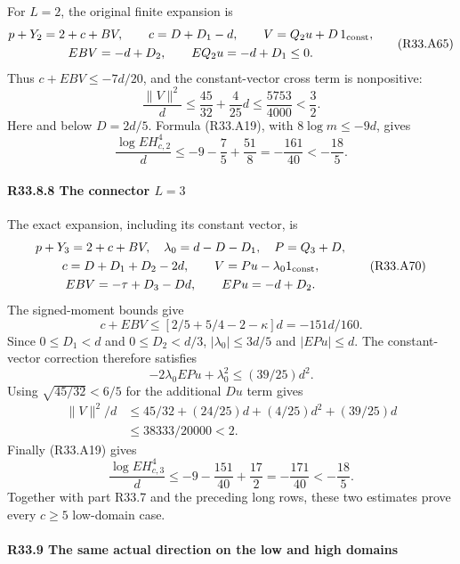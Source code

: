 For \(L=2\), the original finite expansion is
\[
\begin{gathered}
 p+Y_2=2+c+BV,\qquad
 c=D+D_1-d,\qquad V=Q_2u+D\,1_{\rm const},\\
 EBV=-d+D_2,\qquad EQ_2u=-d+D_1\le0 .
\end{gathered}                                                     \tag{R33.A65}
\]
Thus \(c+EBV\le-7d/20\), and the constant-vector cross term is
nonpositive:
\[
 \frac{\|V\|^2}{d}\le\frac{45}{32}+\frac4{25}d
 \le\frac{5753}{4000}<\frac32.
\]
Here and below \(D=2d/5\). Formula (R33.A19), with
\(8\log m\le-9d\), gives
\[
 \frac{\log EH_{c,2}^4}{d}
 \le-9-\frac75+\frac{51}{8}
 =-\frac{161}{40}<-\frac{18}{5}.                    \tag{R33.A66}
\]

\paragraph{R33.8.8 The connector \(L=3\)}
The exact expansion, including its constant vector, is
\[
\begin{gathered}
 p+Y_3=2+c+BV,\quad
 \lambda_0=d-D-D_1,\quad P=Q_3+D,\\
 c=D+D_1+D_2-2d,\qquad V=Pu-\lambda_0 1_{\rm const},\\
 EBV=-\tau+D_3-Dd,\qquad EPu=-d+D_2 .
\end{gathered}                                                     \tag{R33.A70}
\]
The signed-moment bounds give
\[
 c+EBV\le[2/5+5/4-2-\kappa]d
 =-151d/160.                                         \tag{R33.A71}
\]
Since \(0\le D_1<d\) and \(0\le D_2<d/3\),
\( |\lambda_0|\le3d/5\) and \(|EPu|\le d\).
The constant-vector correction therefore satisfies
\[
 -2\lambda_0 EPu+\lambda_0^2\le(39/25)d^2.
\]
Using \(\sqrt{45/32}<6/5\) for the additional \(Du\) term gives
\[
\begin{aligned}
 \|V\|^2/d
 &\le45/32+(24/25)d+(4/25)d^2+(39/25)d\\
 &\le38333/20000<2.
\end{aligned}
\]
Finally (R33.A19) gives
\[
 \frac{\log EH_{c,3}^4}{d}
 \le-9-\frac{151}{40}+\frac{17}{2}
 =-\frac{171}{40}<-\frac{18}{5}.                    \tag{R33.A73}
\]
Together with part R33.7 and the preceding long rows, these two
estimates prove every \(c\ge5\) low-domain case.

\paragraph{R33.9 The same actual direction on the low and high domains}

